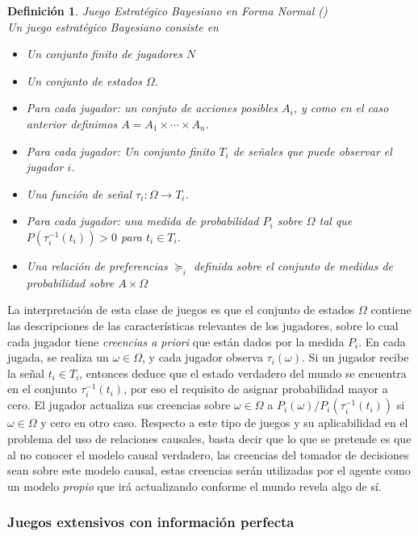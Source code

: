\documentclass[11pt]{article}
\theoremstyle{plain}
\newtheorem{defi}[teo]{Definición}
\begin{document}
		\begin{defi}{Juego Estratégico Bayesiano en Forma Normal (\cite{osborne1994course})}\\
		Un juego estratégico Bayesiano consiste en
		\begin{itemize}
		\item Un conjunto finito de jugadores $N$
		\item Un conjunto de \textit{estados} $\Omega$.
		\item Para cada jugador: un conjuto de acciones posibles $A_i$, y como en el caso anterior definimos $A = A_1 \times \cdots \times A_n$.
		\item Para cada jugador: Un conjunto finito $T_i$ de señales que puede observar el jugador $i$.
		\item Una función de señal $\tau_i : \Omega \to T_i$.
		\item Para cada jugador: una medida de probabilidad $P_i$ sobre $\Omega$ tal que $P( \tau^{-1}_i (t_i)) >0$ para $t_i \in T_i$.
		\item Una relación de preferencias $\succeq_i$ definida sobre el conjunto de medidas de probabilidad sobre $A \times \Omega$
		\end{itemize}
		\end{defi}
		La interpretación de esta clase de juegos es que el conjunto de estados $\Omega$ contiene las descripciones de las características relevantes de los jugadores, sobre lo cual cada jugador tiene \textit{creencias a priori} que están dados por la medida $P_i$. En cada jugada, se realiza un $\omega \in \Omega$, y cada jugador observa $\tau_i (\omega)$. Si un jugador recibe la señal $t_i \in T_i$, entonces deduce que el estado verdadero del mundo se encuentra en el conjunto $\tau^{-1}_i (t_i)$, por eso el requisito de asignar probabilidad mayor a cero. El jugador actualiza sus creencias sobre $\omega \in \Omega$ a $P_i(\omega) / P_i(\tau^{-1}_i (t_i))$ si $\omega \in \Omega$ y cero en otro caso. Respecto a este tipo de juegos y su aplicabilidad en el problema del uso de relaciones causales, basta decir que lo que se pretende es que al no conocer el modelo causal verdadero, las creencias del tomador de decisiones sean sobre este modelo causal, estas creencias serán utilizadas por el agente como un modelo \textit{propio} que irá actualizando conforme el mundo revela algo de sí.
		\subsubsection{Juegos extensivos con información perfecta}
\end{document}
